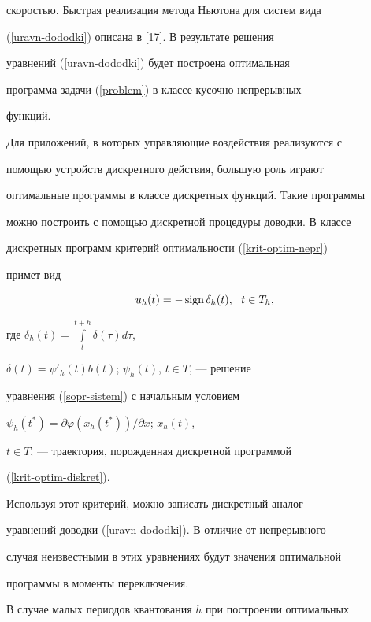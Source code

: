 скоростью. Быстрая реализация метода Ньютона для систем вида


(\ref{uravn-dododki}) описана в [17]. В результате решения


уравнений (\ref{uravn-dododki}) будет построена оптимальная


программа задачи (\ref{problem}) в классе кусочно-непрерывных


функций.





Для приложений, в которых управляющие воздействия реализуются с


помощью устройств дискретного действия, большую роль играют


оптимальные программы в классе дискретных функций. Такие программы


можно построить с помощью дискретной процедуры доводки. В классе


дискретных программ критерий оптимальности (\ref{krit-optim-nepr})


примет вид


\begin{equation}\label{krit-optim-diskret}


u_h(t)=-\sign\delta_h(t),\ \ t\in T_h,


\end{equation}


где $\delta_h(t)=\int\limits_t^{t+h}\delta(\tau)d\tau$,


$\delta(t)=\psi'_h(t)b(t)$; $\psi_h(t)$, $t\in T$, --- решение


уравнения (\ref{sopr-sistem}) с начальным условием


$\psi_h(t^*)=\partial\varphi(x_h(t^*))/\partial x$; $x_h(t)$,


$t\in T$, --- траектория, порожденная дискретной программой


(\ref{krit-optim-diskret}).





Используя этот критерий, можно записать дискретный аналог


уравнений доводки (\ref{uravn-dododki}). В отличие от непрерывного


случая неизвестными в этих уравнениях будут значения оптимальной


программы в моменты переключения.





В случае малых периодов квантования $h$ при построении оптимальных


